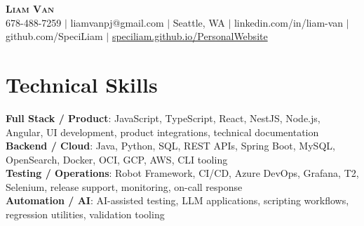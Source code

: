 \documentclass[letterpaper,11pt]{article}
\begin{document}

%
\begin{center}
    \textbf{\Huge \scshape Liam Van} \\ \vspace{1pt}
    \small 678-488-7259 $|$ \small {liamvanpj@gmail.com} $|$ Seattle, WA
 {{$|$ linkedin.com/in/liam-van} {$|$ github.com/SpeciLiam} {$|$ \href{https://speciliam.github.io/PersonalWebsite}{speciliam.github.io/PersonalWebsite}}}

\end{center}

\section{Technical Skills}
 \begin{itemize}[leftmargin=0.15in, label={}]
    \small{\item{
     \textbf{Full Stack / Product}{: JavaScript, TypeScript, React, NestJS, Node.js, Angular, UI development, product integrations, technical documentation} \\
     \textbf{Backend / Cloud}{: Java, Python, SQL, REST APIs, Spring Boot, MySQL, OpenSearch, Docker, OCI, GCP, AWS, CLI tooling} \\
     \textbf{Testing / Operations}{: Robot Framework, CI/CD, Azure DevOps, Grafana, T2, Selenium, release support, monitoring, on-call response} \\
     \textbf{Automation / AI}{: AI-assisted testing, LLM applications, scripting workflows, regression utilities, validation tooling} \\
    }}
 \end{itemize}
%
\end{document}
